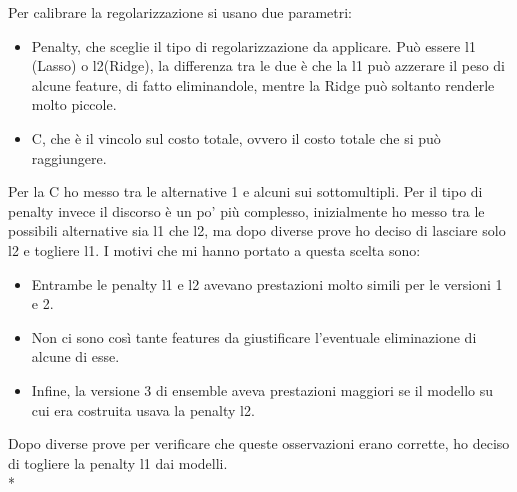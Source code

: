 Per calibrare la regolarizzazione si usano due parametri:
\begin{itemize}
	\item Penalty, che sceglie il tipo di regolarizzazione da applicare. Può essere l1 (Lasso) o l2(Ridge), la differenza tra le due è che la l1 può azzerare il peso di alcune feature, di fatto eliminandole, mentre la Ridge può soltanto renderle molto piccole.
	\item C, che è il vincolo sul costo totale, ovvero il costo totale che si può raggiungere.

\end{itemize}

Per la C ho messo tra le alternative 1 e alcuni sui sottomultipli. Per il tipo di penalty invece il discorso è un po' più complesso, inizialmente ho messo tra le possibili alternative sia l1 che l2, ma dopo diverse prove ho deciso di lasciare solo l2 e togliere l1. I motivi che mi hanno portato a questa scelta sono:

\begin{itemize}
	\item Entrambe le penalty l1 e l2 avevano prestazioni molto simili per le versioni  1 e 2.
	\item Non ci sono così tante features da giustificare l'eventuale eliminazione di alcune di esse.
	\item Infine, la versione 3 di ensemble aveva prestazioni maggiori se il modello su cui era costruita usava la penalty l2.

\end{itemize}

Dopo diverse prove per verificare che queste osservazioni erano corrette, ho deciso di togliere la penalty l1 dai modelli. \\*

